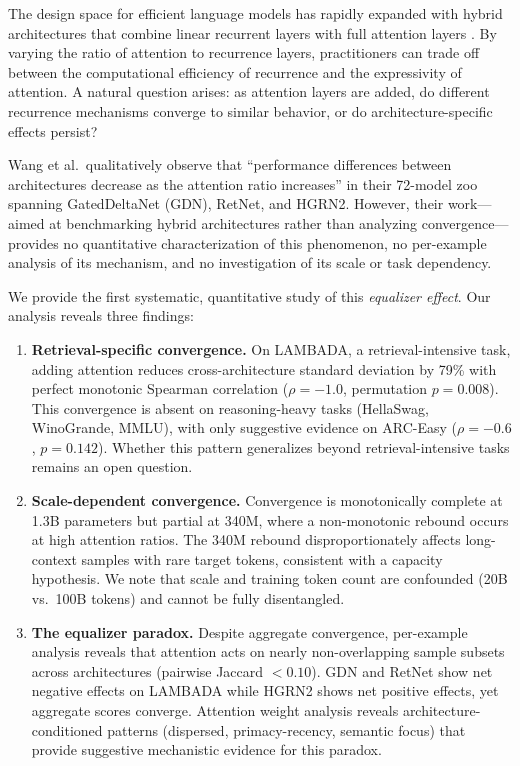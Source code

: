 \documentclass[11pt,a4paper]{article}
\begin{document}
The design space for efficient language models has rapidly expanded with hybrid architectures that combine linear recurrent layers with full attention layers \citep{wang2025mzoobenchmarkinghybridllms}. By varying the ratio of attention to recurrence layers, practitioners can trade off between the computational efficiency of recurrence and the expressivity of attention. A natural question arises: as attention layers are added, do different recurrence mechanisms converge to similar behavior, or do architecture-specific effects persist?

Wang et al.\ qualitatively observe that ``performance differences between architectures decrease as the attention ratio increases'' in their 72-model zoo spanning GatedDeltaNet (GDN), RetNet, and HGRN2. However, their work---aimed at benchmarking hybrid architectures rather than analyzing convergence---provides no quantitative characterization of this phenomenon, no per-example analysis of its mechanism, and no investigation of its scale or task dependency.

We provide the first systematic, quantitative study of this \emph{equalizer effect}. Our analysis reveals three findings:

\begin{enumerate}
    \item \textbf{Retrieval-specific convergence.} On LAMBADA, a retrieval-intensive task, adding attention reduces cross-architecture standard deviation by 79\% with perfect monotonic Spearman correlation ($\rho{=}{-}1.0$, permutation $p{=}0.008$). This convergence is absent on reasoning-heavy tasks (HellaSwag, WinoGrande, MMLU), with only suggestive evidence on ARC-Easy ($\rho{=}{-}0.6$, $p{=}0.142$). Whether this pattern generalizes beyond retrieval-intensive tasks remains an open question.
    \item \textbf{Scale-dependent convergence.} Convergence is monotonically complete at 1.3B parameters but partial at 340M, where a non-monotonic rebound occurs at high attention ratios. The 340M rebound disproportionately affects long-context samples with rare target tokens, consistent with a capacity hypothesis. We note that scale and training token count are confounded (20B vs.\ 100B tokens) and cannot be fully disentangled.
    \item \textbf{The equalizer paradox.} Despite aggregate convergence, per-example analysis reveals that attention acts on nearly non-overlapping sample subsets across architectures (pairwise Jaccard $< 0.10$). GDN and RetNet show net negative effects on LAMBADA while HGRN2 shows net positive effects, yet aggregate scores converge. Attention weight analysis reveals architecture-conditioned patterns (dispersed, primacy-recency, semantic focus) that provide suggestive mechanistic evidence for this paradox.
\end{enumerate}
\end{document}
